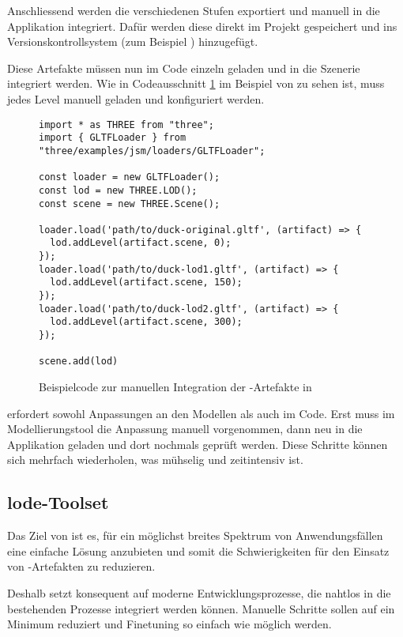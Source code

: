 Anschliessend werden die verschiedenen Stufen exportiert und manuell in die Applikation integriert. Dafür werden diese direkt im Projekt gespeichert und ins Versionskontrollsystem (zum Beispiel ) hinzugefügt.

Diese Artefakte müssen nun im Code einzeln geladen und in die Szenerie integriert werden. Wie in Codeausschnitt \ref{code:threejsManualLodUsage} im Beispiel von  zu sehen ist, muss jedes Level manuell geladen und konfiguriert werden.
\begin{figure}[H]
  \begin{lstlisting}[style=JavaScript]
import * as THREE from "three";
import { GLTFLoader } from "three/examples/jsm/loaders/GLTFLoader";

const loader = new GLTFLoader();
const lod = new THREE.LOD();
const scene = new THREE.Scene();

loader.load('path/to/duck-original.gltf', (artifact) => {
  lod.addLevel(artifact.scene, 0);
});
loader.load('path/to/duck-lod1.gltf', (artifact) => {
  lod.addLevel(artifact.scene, 150);
});
loader.load('path/to/duck-lod2.gltf', (artifact) => {
  lod.addLevel(artifact.scene, 300);
});

scene.add(lod)
  \end{lstlisting}
  \caption{Beispielcode zur manuellen Integration der -Artefakte in }
  \label{code:threejsManualLodUsage}
\end{figure}

 erfordert sowohl Anpassungen an den Modellen als auch im Code. Erst muss im Modellierungstool die Anpassung manuell vorgenommen, dann neu in die Applikation geladen und dort nochmals geprüft werden. Diese Schritte können sich mehrfach wiederholen, was mühselig und zeitintensiv ist.

\subsection{lode-Toolset}

Das Ziel von  ist es, für ein möglichst breites Spektrum von Anwendungsfällen eine einfache Lösung anzubieten und somit die Schwierigkeiten für den Einsatz von -Artefakten zu reduzieren.

Deshalb setzt  konsequent auf moderne Entwicklungsprozesse, die nahtlos in die bestehenden Prozesse integriert werden können. Manuelle Schritte sollen auf ein Minimum reduziert und Finetuning so einfach wie möglich werden.

